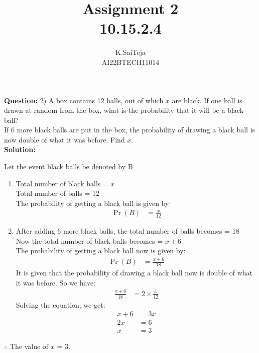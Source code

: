 \documentclass[journal,12pt,two column]{IEEEtran}
\title{Assignment 2 \\ 10.15.2.4}
\author{K.SaiTeja \\ AI22BTECH11014}
\providecommand{\pr}[1]{\ensuremath{\Pr\left(#1\right)}}
\newcommand{\question}{\noindent \textbf{Question: }}
\newcommand{\solution}{\noindent \textbf{Solution: }}
\begin{document}
\maketitle
\question 2)
A box contains 12 balls, out of which $x$ are black. If one ball is drawn at random from the box, what is the probability that it will be a black ball?\\ If 6 more black balls are put in the box, the probability of drawing a black ball is now double of what it was before. Find $x$.\\
\solution 
\begin{center}
Let the event black balls be denoted by B
\end{center}
\begin{enumerate}
  
    \item Total number of black balls = $x$\\
          Total number of balls = 12 \\
   The probability of getting a black ball is given by:
\begin{align}   
   \pr{B} &= \frac{x}{12} 
\end{align}  
  \item After adding 6 more black balls, the total number of balls becomes = 18 \\  
    Now the total number of black balls becomes = $x+6$.  \\
    The probability of getting a black ball now is given by:
\begin{align}  
  \pr{B} &= \frac{x+6}{18} 
\end{align}  
    It is given that the probability of drawing a black ball now is double of what it was before. So we have:    
\begin{align}
  \frac{x+6}{18} &= 2 \times \frac{x}{12}
\end{align}  
   Solving the equation, we get:
\begin{align}   
 x + 6 &= 3x \\
  2x &= 6 \\
  x &= 3
\end{align}
 
\end{enumerate}
\begin{center}
$\therefore$ The value of $x$ = 3.
\end{center}
\end{document}
